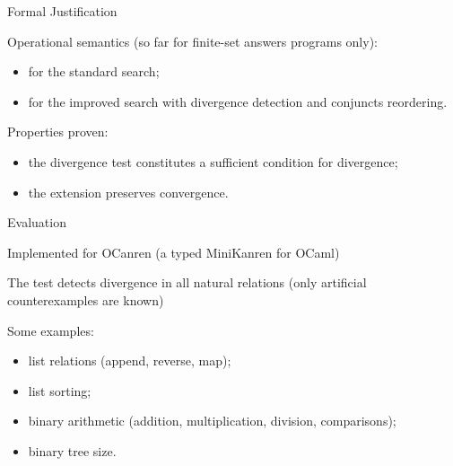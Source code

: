 \documentclass{beamer}
\theoremstyle{definition}
\theoremstyle{plain} %
\begin{document}
\begin{frame}{Formal Justification}

Operational semantics (so far for finite-set answers programs only):
\vskip3mm

\begin{itemize}
  \item for the standard search;
  \item for the improved search with divergence detection and conjuncts reordering.
\end{itemize}
 
 \vskip8mm
 
 Properties proven:
 \vskip3mm
 \begin{itemize}
 \item the divergence test constitutes a sufficient condition for divergence;
 \item the extension preserves convergence.
 \end{itemize}
 
\end{frame}

\begin{frame}{Evaluation}

Implemented for OCanren (a typed MiniKanren for OCaml)

\vskip8mm

The test detects divergence in all natural relations (only artificial counterexamples are known)

\vskip8mm

Some examples:
 
\begin{itemize}
 \item list relations (append, reverse, map);
 \item list sorting;
 \item binary arithmetic (addition, multiplication, division, comparisons);
 \item binary tree size.
\end{itemize}
 
\end{frame}
\end{document}
